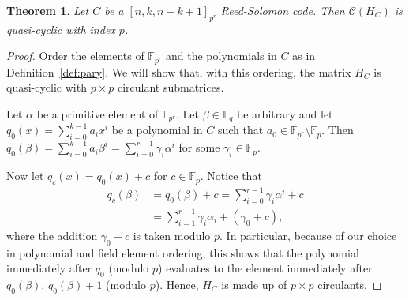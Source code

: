 \documentclass[10pt,a4paper]{amsart}
\newtheorem{theorem}{Theorem}
\newcommand{\F}{\mathbb{F}}
\begin{document}
\begin{theorem} \label{thm:qc}
    Let $C$ be a $[n,k,n-k+1]_{p^r}$ Reed-Solomon code. Then $\mathcal{C}(H_C)$ is quasi-cyclic with index $p$. 
\end{theorem}

\begin{proof}
    Order the elements of $\F_{p^r}$ and the polynomials in $C$ as in Definition~\ref{def:pary}. We will show that, with this ordering, the matrix $H_C$ is quasi-cyclic with $p \times p$ circulant submatrices.

    Let $\alpha$ be a primitive element of $\F_{p^r}$. Let $\beta \in \F_q$ be arbitrary and let $q_0(x) = \sum_{i=0}^{k-1} a_i x^i$ be a polynomial in $C$ such that $a_0\in \F_{p^{r}}\setminus \F_p$.
    Then $q_0(\beta) = \sum_{i=0}^{k-1} a_i \beta^i = \sum_{i=0}^{r-1} \gamma_i \alpha^i$ for some $\gamma_i \in \F_p$. 

    Now let $q_c(x) = q_0(x) + c$ for $c \in \F_p$. Notice that 
    \begin{align*}
        q_c(\beta) &= q_0(\beta) + c = \sum_{i=0}^{r-1} \gamma_i \alpha^i + c \\
        &=  \sum_{i=1}^{r-1} \gamma_i \alpha_i + (\gamma_0+c),
    \end{align*}
    where the addition $\gamma_0 + c$ is taken modulo $p$. In particular, because of our choice in polynomial and field element ordering, this shows that the polynomial immediately after $q_0$ (modulo $p$) evaluates to the element immediately after $q_0(\beta)$, $q_0(\beta)+1$ (modulo $p$). Hence, $H_C$ is made up of $p \times p$ circulants.
\end{proof}
\end{document}
